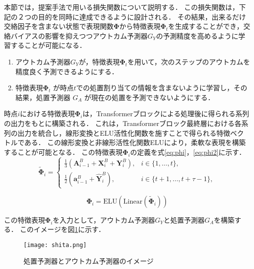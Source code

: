 \documentclass[dvipdfmx]{jreport}
\begin{document}
本節では，提案手法で用いる損失関数について説明する．
この損失関数は，下記の２つの目的を同時に達成できるように設計される．
その結果，出来るだけ交絡因子を含まない状態で表現関数$\boldsymbol{\Phi}$から特徴表現$\boldsymbol{\Phi}_t$を生成することができ，交絡バイアスの影響を抑えつつアウトカム予測器$G_Y$の予測精度を高めるように学習することが可能になる．
\begin{tcolorbox}[title=\textbf{提案手法での損失関数の狙い}]
    \begin{enumerate}
        \item アウトカム予測器$G_Y$が，特徴表現$\boldsymbol{\Phi}_t$を用いて，次のステップのアウトカムを精度良く予測できるようにする．
        \item 特徴表現$\boldsymbol{\Phi}_t$ が時点$t$での処置割り当ての情報を含まないように学習し，その結果，処置予測器 $G_A$ が現在の処置を予測できないようにする．
    \end{enumerate}
\end{tcolorbox}

時点$i$における特徴表現$\boldsymbol{\Phi}_i$は，Transformerブロックによる処理後に得られる系列の出力をもとに構築される．
これは，Transformerブロック最終層における各系列の出力を統合し，線形変換とELU活性化関数を施すことで得られる特徴ベクトルである．
この線形変換と非線形活性化関数ELUにより，柔軟な表現を構築することが可能となる．
この特徴表現$\boldsymbol{\Phi}_i$の定義を式\eqref{eq:phi}，\eqref{eq:phi2}に示す．
\begin{equation}
    \tilde{\boldsymbol{\Phi}}_i =
    \begin{cases}
    \frac{1}{3} \left( \mathbf{A}^B_{i-1} + \mathbf{X}^B_i + \mathbf{Y}^B_i \right), & i \in \{1, \ldots, t\}, \\[1em]
    \frac{1}{2} \left( \mathbf{a}^B_{i-1} + \hat{\mathbf{Y}}^B_i \right), & i \in \{t+1, \ldots, t+\tau -1\},
    \end{cases}
    \label{eq:phi}
\end{equation}

\begin{equation}
    \boldsymbol{\Phi}_i = \mathrm{ELU}\left( \mathrm{Linear} \left( \tilde{\boldsymbol{\Phi}}_i \right) \right) \label{eq:phi2}
\end{equation}

この特徴表現$\boldsymbol{\Phi}_i$を入力として，アウトカム予測器$G_Y$と処置予測器$G_A$を構築する．
このイメージを図\ref{fig:shita}に示す．
\begin{figure}[h]
    \begin{center}
        \texttt{[image: shita.png]} 
        \caption{処置予測器とアウトカム予測器のイメージ} \label{fig:shita}
    \end{center}
\end{figure}
\end{document}
